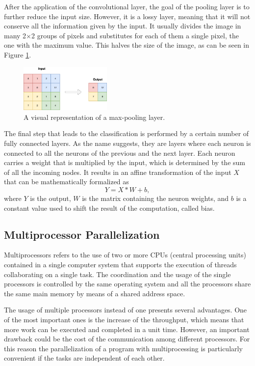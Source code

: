\documentclass{usiinftr}
\begin{document}
After the application of the convolutional layer, the goal of the pooling layer  is to further reduce the input size. However, it  is a lossy layer, meaning that it will not conserve all the information given by the input.
It usually divides the image in many 2$\times$2 groups of pixels and substitutes for each of them a single pixel, the one with the maximum  value. This halves the size of the image, as can be seen in Figure \ref{fig:12}.
\begin{figure}[H]
	\centering
	\includegraphics[width=0.4\textwidth]{img/maxpool}
	\caption{A visual representation of a max-pooling layer.}
	\label{fig:12}
\end{figure}

The final step that leads to the classification is performed by a certain number of fully connected layers. As the name suggests, they are layers where each neuron is connected to all the neurons of the previous and the next layer. Each neuron carries a weight that is multiplied by the input, which is determined by the sum of all the incoming nodes. It results in an affine transformation of the input $X$ that can be mathematically formalized as
$$Y=X*W+b,$$
where $Y$ is the output, $W$ is the matrix containing the neuron weights, and $b$ is a constant value used to shift the result of the computation, called bias. 



\subsection{Multiprocessor Parallelization}
Multiprocessors refers to the use of two or more CPUs (central processing units) contained in a single computer system that supports the execution of threads collaborating on a single task. The coordination and the usage of the single processors is controlled by the same operating system and all the processors share the same main memory by means of a shared address space.

The usage of multiple processors instead of one presents several advantages. One of the most important ones is the increase of the  throughput, which means that more work can be executed and completed in a unit time. However, an important drawback could be the cost of the communication among different processors. For this reason the parallelization of a program with multiprocessing is particularly convenient if the tasks are independent of each other.
\end{document}
